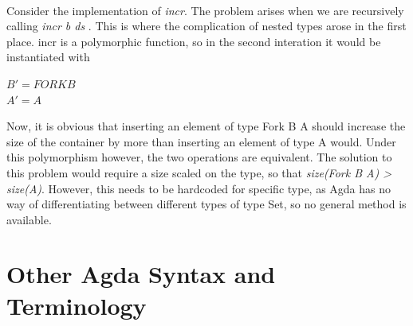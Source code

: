 \documentclass[12pt,twoside,notitlepage]{report}
\begin{document}
\begin{code}
\\
\>[4]\<[10]%
\>[10]    \AgdaSymbol{\{}\AgdaSymbol{\}}\<%
\\
\>[4]\<[10]%
\>[10]    \AgdaSymbol{\{} \AgdaSymbol{\}}\<%
\\
\>[0]\<[4]%
\>[4]   \AgdaSymbol{=}   \<%
\\
\>[0]\<[4]%
\>[4]  \AgdaSymbol{(}  \AgdaSymbol{)} \AgdaSymbol{=}  \AgdaSymbol{(}  \AgdaSymbol{)} \<%
\\
\>[0]\<[4]%
\>[4]  \AgdaSymbol{(}  \AgdaSymbol{)} \AgdaSymbol{=} \AgdaSymbol{\{!   !\}} \<[34]%
\>[34]\<%
\\
\end{code}


Consider the implementation of \textit{incr}. The problem arises when we are recursively calling \textit{incr b ds} . This is where the complication of nested types arose in the first place. incr is a polymorphic function, so in the second interation it would be instantiated with 
\begin{center}
$ B' = FORK B$ \\
$ A' = A $ \\
\end{center}
Now, it is obvious that inserting an element of type Fork B A should increase the size of the container by more than inserting an element of type A would. Under this polymorphism however, the two operations are equivalent.
The solution to this problem would require a size scaled on the type, so that\textit{ size(Fork B A) > size(A)}. However, this needs to be hardcoded for specific type, as Agda has no way of differentiating between different types of type Set, so no general method is available.

\section{Other Agda Syntax and Terminology}
\end{document}
